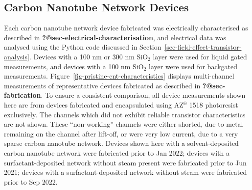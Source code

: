 \documentclass[
  a4paper,
]{scrbook}
\begin{document}
\hypertarget{sec-cnt-devices}{%
\subsection{Carbon Nanotube Network Devices}\label{sec-cnt-devices}}

Each carbon nanotube network device fabricated was electrically
characterised as described in
\textbf{?@sec-electrical-characterisation}, and electrical data was
analysed using the Python code discussed in
Section~\ref{sec-field-effect-transistor-analysis}. Devices with a 100
nm or 300 nm SiO\(_2\) layer were used for liquid gated measurements,
and devices with a 100 nm SiO\(_2\) layer were used for backgated
measurements. Figure~\ref{fig-pristine-cnt-characteristics} displays
multi-channel measurements of representative devices fabricated as
described in \textbf{?@sec-fabrication}. To ensure a consistent
comparison, all device measurements shown here are from devices
fabricated and encapsulated using AZ\(^\circledR\) 1518 photoresist
exclusively. The channels which did not exhibit reliable transistor
characteristics are not shown. These ``non-working'' channels were
either shorted, due to metal remaining on the channel after lift-off, or
were very low current, due to a very sparse carbon nanotube network.
Devices shown here with a solvent-deposited carbon nanotube network were
fabricated prior to Jan 2022; devices with a surfactant-deposited
network without steam present were fabricated prior to Jun 2021; devices
with a surfactant-deposited network without steam were fabricated prior
to Sep 2022.
\end{document}
